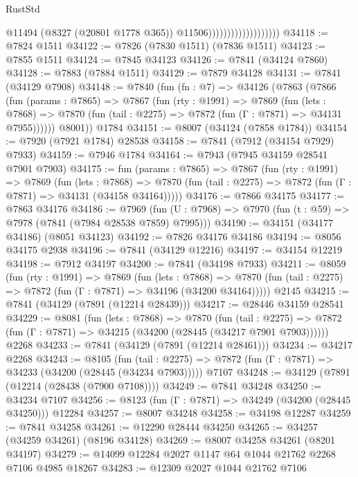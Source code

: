 \begin{lexlean}{RustStd}
\begin{coremodule}
{\begin{coremodule}
{{{{{{{{{{{{{{{{{{{{{{{{{{{{{{{{{{{{{{{{{{{{{{{{{{{{{{                                          @11494
                                          (@8327 (@20801 @1778 @365))
                                          @11506)))))))))))))))))))
@34118 := @7824 @1511
@34122 := @7826 (@7830 @1511) (@7836 @1511)
@34123 := @7855 @1511
@34124 := @7845 @34123
@34126 := @7841 (@34124 @7860)
@34128 := @7883 (@7884 @1511)
@34129 := @7879 @34128
@34131 := @7841 (@34129 @7908)
@34148 := @7840
    (fun (fn : @7) =>
    @34126
      (@7863
        (@7866
          (fun (params : @7865) =>
          @7867
            (fun (rty : @1991) =>
            @7869
              (fun (lets : @7868) =>
              @7870 (fun (tail : @2275) => @7872 (fun (Γ : @7871) => @34131 @7955))))))
        @8001))
    @1784
@34151 := @8007 (@34124 (@7858 @1784))
@34154 := @7920 (@7921 @1784) @28538
@34158 := @7841 (@7912 (@34154 @7929) @7933)
@34159 := @7946 @1784
@34164 := @7943 (@7945 @34159 @28541 @7901 @7903)
@34175 := fun (params : @7865) =>
  @7867
    (fun (rty : @1991) =>
    @7869
      (fun (lets : @7868) =>
      @7870 (fun (tail : @2275) => @7872 (fun (Γ : @7871) => @34131 (@34158 @34164)))))
@34176 := @7866 @34175
@34177 := @7863 @34176
@34186 := @7969
    (fun (U : @7968) => @7970 (fun (t : @59) => @7978 (@7841 (@7984 @28538 @7859) @7995)))
@34190 := @34151 (@34177 @34186) (@8051 @34123)
@34192 := @7826 @34176 @34186
@34194 := @8056 @34175 @2938
@34196 := @7841 (@34129 @12216)
@34197 := @34154 @12219
@34198 := @7912 @34197
@34200 := @7841 (@34198 @7933)
@34211 := @8059
    (fun (rty : @1991) =>
    @7869
      (fun (lets : @7868) =>
      @7870 (fun (tail : @2275) => @7872 (fun (Γ : @7871) => @34196 (@34200 @34164)))))
    @2145
@34215 := @7841 (@34129 (@7891 (@12214 @28439)))
@34217 := @28446 @34159 @28541
@34229 := @8081
    (fun (lets : @7868) =>
    @7870
      (fun (tail : @2275) =>
      @7872 (fun (Γ : @7871) => @34215 (@34200 (@28445 (@34217 @7901 @7903))))))
    @2268
@34233 := @7841 (@34129 (@7891 (@12214 @28461)))
@34234 := @34217 @2268
@34243 := @8105
    (fun (tail : @2275) => @7872 (fun (Γ : @7871) => @34233 (@34200 (@28445 (@34234 @7903)))))
    @7107
@34248 := @34129 (@7891 (@12214 (@28438 (@7900 @7108))))
@34249 := @7841 @34248
@34250 := @34234 @7107
@34256 := @8123 (fun (Γ : @7871) => @34249 (@34200 (@28445 @34250))) @12284
@34257 := @8007 @34248
@34258 := @34198 @12287
@34259 := @7841 @34258
@34261 := @12290 @28444 @34250
@34265 := @34257 (@34259 @34261) (@8196 @34128)
@34269 := @8007 @34258 @34261 (@8201 @34197)
@34279 := @14099 @12284 @2027 @1147 @64 @1044 @21762 @2268 @7106 @4985 @18267
@34283 := @12309 @2027 @1044 @21762 @7106
}}}}}}}}}}}}}}}}}}}}}}}}}}}}}}}}}}}}}}}}}}}}}}}}}}}}}}
\end{coremodule}}
\end{coremodule}
\end{lexlean}
